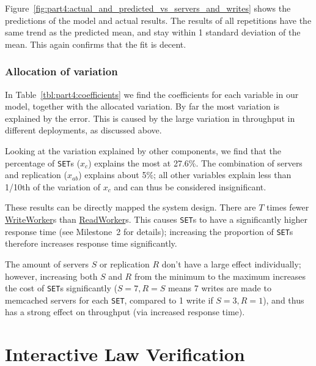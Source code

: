 \documentclass[11pt]{article}
\newcommand{\set}[0]{\texttt{SET}}
\newcommand{\linkmain}[1]{\href{https://gitlab.inf.ethz.ch/pungast/asl-fall16-project/blob/master/src/main/java/asl/#1.java}{#1}}
\begin{document}
Figure~\ref{fig:part4:actual_and_predicted_vs_servers_and_writes} shows the predictions of the model and actual results. The results of all repetitions have the same trend as the predicted mean, and stay within 1 standard deviation of the mean. This again confirms that the fit is decent.

\subsubsection{Allocation of variation}



In Table~\ref{tbl:part4:coefficients} we find the coefficients for each variable in our model, together with the allocated variation. By far the most variation is explained by the error. This is caused by the large variation in throughput in different deployments, as discussed above.

Looking at the variation explained by other components, we find that the percentage of \set{}s ($x_c$) explains the most at 27.6\%. The combination of servers and replication ($x_{ab}$) explains about 5\%; all other variables explain less than 1/10th of the variation of $x_c$ and can thus be considered insignificant.

These results can be directly mapped the system design. There are $T$ times fewer \linkmain{WriteWorker}s than \linkmain{ReadWorker}s. This causes \set{}s to have a significantly higher response time (see Milestone~2 for details); increasing the proportion of \set{}s therefore increases response time significantly.

The amount of servers $S$ or replication $R$ don't have a large effect individually; however, increasing both $S$ and $R$ from the minimum to the maximum increases the cost of \set{}s significantly ($S=7,R=S$ means 7 writes are made to memcached servers for each \set{}, compared to 1 write if $S=3,R=1$), and thus has a strong effect on throughput (via increased response time).

\clearpage
\section{Interactive Law Verification}\label{sec:part5-interactive-law}
\end{document}
